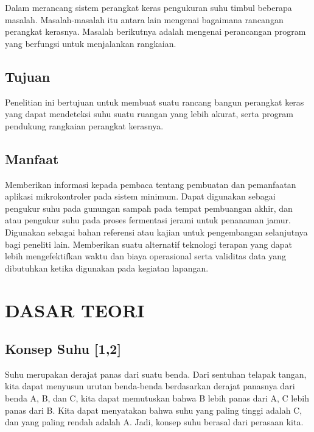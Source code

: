 \documentclass{jtetiproposalskripsi}
\begin{document}
Dalam merancang sistem perangkat keras pengukuran suhu timbul beberapa masalah. Masalah-masalah itu antara lain mengenai bagaimana rancangan perangkat kerasnya. Masalah berikutnya adalah mengenai perancangan program yang berfungsi untuk menjalankan rangkaian.



\section{Tujuan}

Penelitian ini bertujuan untuk membuat suatu rancang bangun perangkat keras yang dapat mendeteksi suhu suatu ruangan yang lebih akurat, serta program pendukung rangkaian perangkat kerasnya.



\section{Manfaat}

Memberikan informasi kepada pembaca tentang pembuatan dan pemanfaatan aplikasi mikrokontroler pada sistem minimum. Dapat digunakan sebagai pengukur suhu pada gunungan sampah pada tempat pembuangan akhir, dan atau pengukur suhu pada proses fermentasi jerami untuk penanaman jamur. Digunakan sebagai bahan referensi atau kajian untuk pengembangan selanjutnya bagi peneliti lain. Memberikan suatu alternatif teknologi terapan yang dapat lebih mengefektifkan waktu dan biaya operasional serta validitas data yang dibutuhkan ketika digunakan pada kegiatan lapangan.






\chapter{DASAR TEORI}                

\section{Konsep Suhu [1,2]}

Suhu merupakan derajat panas dari suatu benda. Dari sentuhan telapak tangan, kita dapat menyusun urutan benda-benda berdasarkan derajat panasnya dari benda A, B, dan C, kita dapat memutuskan bahwa B lebih panas dari A, C lebih panas dari B. Kita dapat menyatakan bahwa suhu yang paling tinggi adalah C, dan yang paling rendah adalah A. Jadi, konsep suhu berasal dari perasaan kita.
\end{document}
